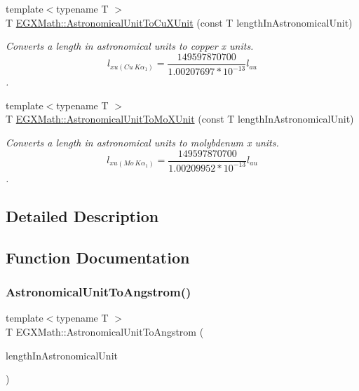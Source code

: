 \begin{DoxyCompactItemize}
{\footnotesize template$<$typename T $>$ }\\T \mbox{\hyperlink{group___e_g_x_math-_conversions-_length_conversions-_astronomical-_astronomical_unit-_non-_s_i_ga00eedd6324f9a6b31af3ae3fa14ca644}{E\+G\+X\+Math\+::\+Astronomical\+Unit\+To\+Cu\+X\+Unit}} (const T length\+In\+Astronomical\+Unit)
\begin{DoxyCompactList}\small\item\em Converts a length in astronomical units to copper x units. \[ l_{xu(Cu\ K\alpha_1)}= \frac{149597870700}{1.00207697*10^{-13}} l_{au} \]. \end{DoxyCompactList}\item 
{\footnotesize template$<$typename T $>$ }\\T \mbox{\hyperlink{group___e_g_x_math-_conversions-_length_conversions-_astronomical-_astronomical_unit-_non-_s_i_ga8b3dc85e14d6129ebfa2f6336d63bf9c}{E\+G\+X\+Math\+::\+Astronomical\+Unit\+To\+Mo\+X\+Unit}} (const T length\+In\+Astronomical\+Unit)
\begin{DoxyCompactList}\small\item\em Converts a length in astronomical units to molybdenum x units. \[ l_{xu(Mo\ K\alpha_1)}=\frac{149597870700}{1.00209952*10^{-13}} l_{au} \]. \end{DoxyCompactList}\end{DoxyCompactItemize}


\subsection{Detailed Description}


\subsection{Function Documentation}
\mbox{\label{group___e_g_x_math-_conversions-_length_conversions-_astronomical-_astronomical_unit-_non-_s_i_ga5efd14d5ca13719b7e06c4614ac0faba}} 
\subsubsection{\texorpdfstring{Astronomical\+Unit\+To\+Angstrom()}{AstronomicalUnitToAngstrom()}}
{\footnotesize\ttfamily template$<$typename T $>$ \\
T E\+G\+X\+Math\+::\+Astronomical\+Unit\+To\+Angstrom (\begin{DoxyParamCaption}\item[{const T}]{length\+In\+Astronomical\+Unit }\end{DoxyParamCaption})}



